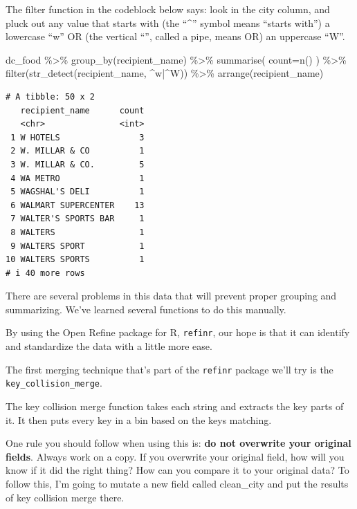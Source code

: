 \documentclass[
  letterpaper,
  DIV=11,
  numbers=noendperiod]{scrreprt}
\newenvironment{Shaded}{\begin{snugshade}}{\end{snugshade}}
\newcommand{\AttributeTok}[1]{\textcolor[rgb]{0.40,0.45,0.13}{#1}}
\newcommand{\FunctionTok}[1]{\textcolor[rgb]{0.28,0.35,0.67}{#1}}
\newcommand{\NormalTok}[1]{\textcolor[rgb]{0.00,0.23,0.31}{#1}}
\newcommand{\SpecialCharTok}[1]{\textcolor[rgb]{0.37,0.37,0.37}{#1}}
\newcommand{\StringTok}[1]{\textcolor[rgb]{0.13,0.47,0.30}{#1}}
\begin{document}
The filter function in the codeblock below says: look in the city
column, and pluck out any value that starts with (the ``\^{}'' symbol
means ``starts with'') a lowercase ``w'' OR (the vertical
``\textbar{}'', called a pipe, means OR) an uppercase ``W''.

\begin{Shaded}
\begin{Highlighting}[]
\NormalTok{dc\_food }\SpecialCharTok{\%\textgreater{}\%}
  \FunctionTok{group\_by}\NormalTok{(recipient\_name) }\SpecialCharTok{\%\textgreater{}\%}
  \FunctionTok{summarise}\NormalTok{(}
    \AttributeTok{count=}\FunctionTok{n}\NormalTok{()}
\NormalTok{  ) }\SpecialCharTok{\%\textgreater{}\%}
  \FunctionTok{filter}\NormalTok{(}\FunctionTok{str\_detect}\NormalTok{(recipient\_name, }\StringTok{\textquotesingle{}\^{}w|\^{}W\textquotesingle{}}\NormalTok{)) }\SpecialCharTok{\%\textgreater{}\%}
  \FunctionTok{arrange}\NormalTok{(recipient\_name)}
\end{Highlighting}
\end{Shaded}

\begin{verbatim}
# A tibble: 50 x 2
   recipient_name      count
   <chr>               <int>
 1 W HOTELS                3
 2 W. MILLAR & CO          1
 3 W. MILLAR & CO.         5
 4 WA METRO                1
 5 WAGSHAL'S DELI          1
 6 WALMART SUPERCENTER    13
 7 WALTER'S SPORTS BAR     1
 8 WALTERS                 1
 9 WALTERS SPORT           1
10 WALTERS SPORTS          1
# i 40 more rows
\end{verbatim}

There are several problems in this data that will prevent proper
grouping and summarizing. We've learned several functions to do this
manually.

By using the Open Refine package for R, \texttt{refinr}, our hope is
that it can identify and standardize the data with a little more ease.

The first merging technique that's part of the \texttt{refinr} package
we'll try is the \texttt{key\_collision\_merge}.

The key collision merge function takes each string and extracts the key
parts of it. It then puts every key in a bin based on the keys matching.

One rule you should follow when using this is: \textbf{do not overwrite
your original fields}. Always work on a copy. If you overwrite your
original field, how will you know if it did the right thing? How can you
compare it to your original data? To follow this, I'm going to mutate a
new field called clean\_city and put the results of key collision merge
there.
\end{document}
